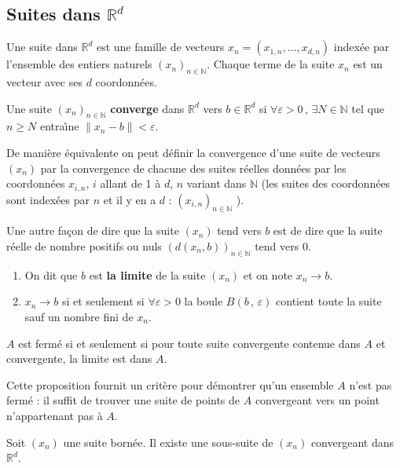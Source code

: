 \documentclass[class=report,crop=false]{standalone}
\begin{document}
\subsection{Suites dans $\mathbb{R}^d$}
\begin{definition}
Une suite dans $\mathbb{R}^d$ est une famille de vecteurs $x_n=(x_{1,n},\ldots,x_{d,n})$ indexée par l'ensemble des entiers naturels $(x_n)_{n\in\mathbb{N}}$. Chaque terme de la suite $x_n$ est un vecteur avec ses $d$ coordonnées.
\end{definition}
\begin{definition}
Une suite $(x_{n})_{n \in \mathbb{N}}$ {\bf converge} dans $\mathbb{R}^d$ vers $b \in \mathbb{R}^d$ si $\forall \varepsilon > 0\,,\,\exists N \in \mathbb{N}$ tel que $n \geqslant N$ entra\^{\i}ne $\|x_{n} - b\| < \varepsilon$.
\end{definition}

De mani\`ere équivalente on peut définir la convergence d'une suite de vecteurs $(x_n)$ par la convergence de chacune des suites réelles données par les coordonnées $x_{i,n}$, $i$ allant de 1 \`a $d$, $n$ variant dans $\mathbb{N}$ (les suites des coordonnées sont indexées par $n$ et il y en a $d$ : $(x_{i,n})_{n\in\mathbb{N}}$ ).

Une autre fa\c con de dire que la suite $(x_n)$ tend vers $b$ est de dire que la suite réelle de nombre positifs ou nuls $(d(x_n,b))_{n\in\mathbb{N}}$ tend vers 0.


\begin{enumerate}
\item On dit que $b$ est {\bf la limite} de la suite $(x_{n})$ et on note $x_{n} \rightarrow b$.
\item $x_{n} \rightarrow b$ si et seulement si $\forall \varepsilon > 0$ la boule $B(b\,,\,\varepsilon)$ contient toute la suite sauf un nombre fini de $x_{n}$.
\end{enumerate}


\begin{proposition}$A$ est fermé si et seulement si pour toute suite convergente contenue dans $A$ et convergente, la limite est dans $A$.
\end{proposition}

Cette proposition fournit un crit\`ere pour démontrer qu'un ensemble $A$ n'est pas fermé : il suffit de trouver une suite de points de $A$ convergeant vers un point n'appartenant pas \`a $A$. 

\begin{theoreme} Soit $(x_n)$ une suite bornée. Il existe une sous-suite de $(x_n)$ convergeant dans $\mathbb{R}^d$.
\end{theoreme}
\end{document}
